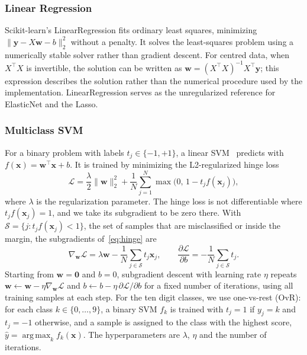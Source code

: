 \documentclass[conference]{IEEEtran}
\DeclareMathOperator*{\argmax}{arg\,max}
\begin{document}
\subsubsection{Linear Regression}
Scikit-learn's LinearRegression fits ordinary least squares, minimizing $\lVert \mathbf y-X\mathbf w-b\rVert_2^2$ without a penalty. It solves the least-squares problem using a numerically stable solver rather than gradient descent. For centred data, when $X^\top X$ is invertible, the solution can be written as $\mathbf w=(X^\top X)^{-1}X^\top\mathbf y$; this expression describes the solution rather than the numerical procedure used by the implementation. LinearRegression serves as the unregularized reference for ElasticNet and the Lasso.

\subsubsection{Multiclass SVM}
For a binary problem with labels $t_j \in \{-1, +1\}$, a linear SVM~\cite{cortes1995} predicts with $f(\mathbf x) = \mathbf w^\top\mathbf x + b$. It is trained by minimizing the L2-regularized hinge loss
\begin{equation}
\mathcal L = \frac{\lambda}{2}\lVert\mathbf w\rVert_2^2 + \frac{1}{N}\sum_{j=1}^{N}\max\bigl(0,\, 1 - t_j f(\mathbf x_j)\bigr),
\label{eq:hinge}
\end{equation}
where $\lambda$ is the regularization parameter. The hinge loss is not differentiable where $t_j f(\mathbf x_j) = 1$, and we take its subgradient to be zero there. With $\mathcal S = \{j : t_j f(\mathbf x_j) < 1\}$, the set of samples that are misclassified or inside the margin, the subgradients of~\eqref{eq:hinge} are
\begin{equation}
\nabla_{\mathbf w}\mathcal L = \lambda\mathbf w - \frac{1}{N}\sum_{j\in\mathcal S} t_j\mathbf x_j, \qquad
\frac{\partial\mathcal L}{\partial b} = -\frac{1}{N}\sum_{j\in\mathcal S} t_j .
\end{equation}
Starting from $\mathbf w = \mathbf 0$ and $b = 0$, subgradient descent with learning rate $\eta$ repeats $\mathbf w \leftarrow \mathbf w - \eta\nabla_{\mathbf w}\mathcal L$ and $b \leftarrow b - \eta\,\partial\mathcal L/\partial b$ for a fixed number of iterations, using all training samples at each step. For the ten digit classes, we use one-vs-rest (OvR): for each class $k \in \{0, \ldots, 9\}$, a binary SVM $f_k$ is trained with $t_j = 1$ if $y_j = k$ and $t_j = -1$ otherwise, and a sample is assigned to the class with the highest score, $\hat y = \argmax_k f_k(\mathbf x)$. The hyperparameters are $\lambda$, $\eta$ and the number of iterations.
\end{document}

